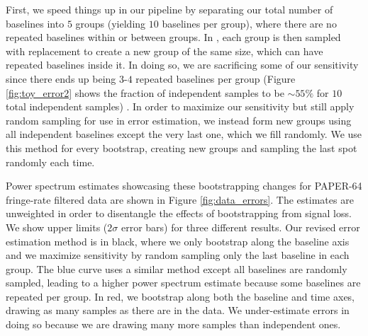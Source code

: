 \documentclass[preprint2,numberedappendix,tighten]{aastex6}  %
\begin{document}
First, we speed things up in our pipeline by separating our total number of baselines into $5$ groups (yielding $10$ baselines per group), where there are no repeated baselines within or between groups. In \citet{ali_et_al2015}, each group is then sampled with replacement to create a new group of the same size, which can have repeated baselines inside it. In doing so, we are sacrificing some of our sensitivity since there ends up being $3$-$4$ repeated baselines per group (Figure \ref{fig:toy_error2} shows the fraction of independent samples to be $\sim55\%$ for $10$ total independent samples) . In order to maximize our sensitivity but still apply random sampling for use in error estimation, we instead form new groups using all independent baselines except the very last one, which we fill randomly. We use this method for every bootstrap, creating new groups and sampling the last spot randomly each time.

Power spectrum estimates showcasing these bootstrapping changes for PAPER-64 fringe-rate filtered data are shown in Figure \ref{fig:data_errors}. The estimates are unweighted in order to disentangle the effects of bootstrapping from signal loss. We show upper limits ($2\sigma$ error bars) for three different results. Our revised error estimation method is in black, where we only bootstrap along the baseline axis and we maximize sensitivity by random sampling only the last baseline in each group. The blue curve uses a similar method except all baselines are randomly sampled, leading to a higher power spectrum estimate because some baselines are repeated per group. In red, we bootstrap along both the baseline and time axes, drawing as many samples as there are in the data. We under-estimate errors in doing so because we are drawing many more samples than independent ones.
\end{document}
